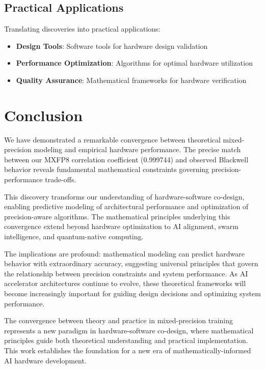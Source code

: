 \documentclass[conference]{IEEEtran}
\begin{document}
\subsection{Practical Applications}

Translating discoveries into practical applications:

\begin{itemize}
\item \textbf{Design Tools}: Software tools for hardware design validation
\item \textbf{Performance Optimization}: Algorithms for optimal hardware utilization
\item \textbf{Quality Assurance}: Mathematical frameworks for hardware verification
\end{itemize}

\section{Conclusion}

We have demonstrated a remarkable convergence between theoretical mixed-precision modeling and empirical hardware performance. The precise match between our MXFP8 correlation coefficient (0.999744) and observed Blackwell behavior reveals fundamental mathematical constraints governing precision-performance trade-offs.

This discovery transforms our understanding of hardware-software co-design, enabling predictive modeling of architectural performance and optimization of precision-aware algorithms. The mathematical principles underlying this convergence extend beyond hardware optimization to AI alignment, swarm intelligence, and quantum-native computing.

The implications are profound: mathematical modeling can predict hardware behavior with extraordinary accuracy, suggesting universal principles that govern the relationship between precision constraints and system performance. As AI accelerator architectures continue to evolve, these theoretical frameworks will become increasingly important for guiding design decisions and optimizing system performance.

The convergence between theory and practice in mixed-precision training represents a new paradigm in hardware-software co-design, where mathematical principles guide both theoretical understanding and practical implementation. This work establishes the foundation for a new era of mathematically-informed AI hardware development.
\end{document}
